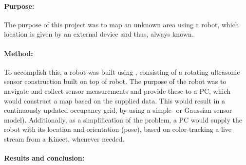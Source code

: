 \paragraph{Purpose:}The purpose of this project was to map an unknown area using a robot, which location is given by an external device and thus, always known.

\paragraph{Method:}To accomplish this, a robot was built using \legoms, consisting of a rotating ultrasonic sensor construction built on top of robot.
The purpose of the robot was to navigate and collect sensor measurements and provide these to a PC, which would construct a map based on the supplied data.
This would result in a continuously updated occupancy grid, by using a simple- or Gaussian sensor model).
Additionally, as a simplification of the problem, a PC would supply the robot with its location and orientation (pose), based on color-tracking a live stream from a Kinect, whenever needed.

\paragraph{Results and conclusion:}
